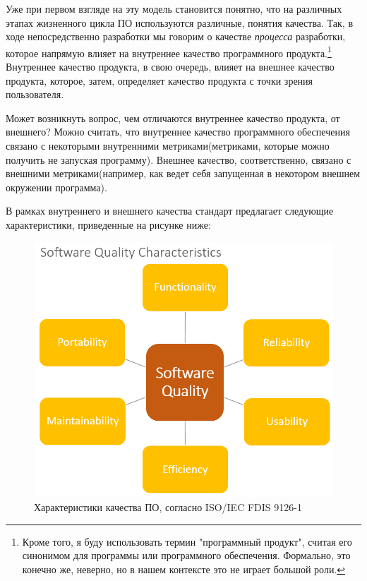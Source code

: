 Уже при первом взгляде на эту модель становится понятно, что на различных этапах жизненного цикла ПО используются различные, понятия качества. Так, в ходе непосредственно разработки мы говорим о качестве \textit{процесса} разработки, которое напрямую влияет на внутреннее качество программного продукта.\footnote{Кроме того, я буду использовать термин "программный продукт", считая его синонимом для программы или программного обеспечения. Формально, это конечно же, неверно, но в нашем контексте это не играет большой роли.} Внутреннее качество продукта, в свою очередь, влияет на внешнее качество продукта, которое, затем, определяет качество продукта с точки зрения пользователя.

Может возникнуть вопрос, чем отличаются внутреннее качество продукта, от внешнего? Можно считать, что внутреннее качество программного обеспечения связано с некоторыми внутренними метриками(метриками, которые можно получить не запуская программу). Внешнее качество, соответственно, связано с внешними метриками(например, как ведет себя запущенная в некотором внешнем окружении программа).

В рамках внутреннего и внешнего качества стандарт предлагает следующие характеристики, приведенные на рисунке ниже:

\begin{figure}[H]
  \centering
  \includegraphics[width=\textwidth]{img/quality_model.png}
  \caption{Характеристики качества ПО, согласно ISO/IEC FDIS 9126-1}
\end{figure}

